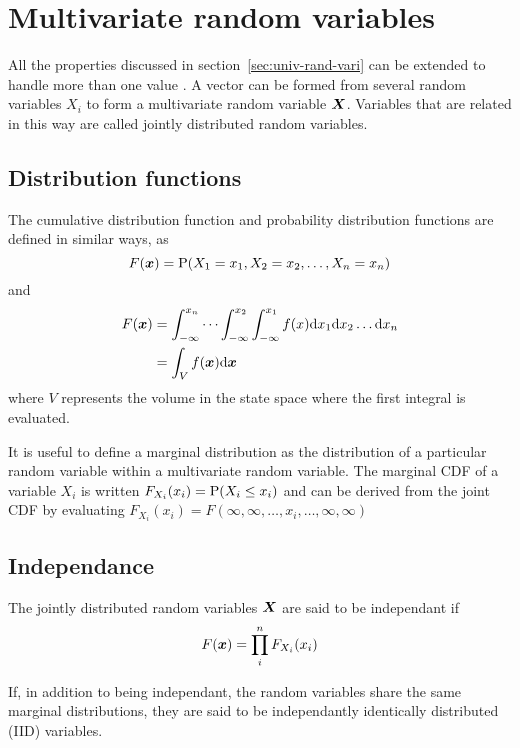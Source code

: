 \section{Multivariate random variables}
All the properties discussed in section~\ref{sec:univ-rand-vari} can be extended to handle more than one value \cite[65]{kulkarni1999modeling}.
A vector can be formed from several random variables $X_i$ to form a multivariate random variable $\boldsymbol{X}$.
Variables that are related in this way are called jointly distributed random variables.

\subsection{Distribution functions}
The cumulative distribution function and probability distribution functions are defined in similar ways, as 
\begin{equation}
  \label{eq:mvcdf}
  F(\boldsymbol{x}) = \mathrm{P}(X_1=x_1, X_2=x_2,\dots, X_n = x_n)
\end{equation}
and
\begin{align}
  \label{eq:mvpdf}
  F(\boldsymbol{x}) &= \int_{-\infty}^{x_n}\cdots\int_{-\infty}^{x_2}\int_{-\infty}^{x_1} f(x) \mathrm{d} x_1 \mathrm{d} x_2 \dots \mathrm{d} x_n \\
              &= \int_V f(\boldsymbol{x}) \mathrm{d} \boldsymbol{x}
\end{align}
where $V$ represents the volume in the state space where the first integral is evaluated.

It is useful to define a marginal distribution as the distribution of a particular random variable within a multivariate random variable.  
The marginal CDF of a variable $X_i$ is written $F_{X_i}(x_i) = \mathrm{P}(X_i \leq x_i)$ and can be derived from the joint CDF by evaluating $F_{X_i}(x_i) = F(\infty,\infty,\dots,x_i,\dots,\infty,\infty)$

\subsection{Independance}
The jointly distributed random variables $\boldsymbol{X}$ are said to be independant if 
\begin{equation}
  \label{eq:independance}
  F(\boldsymbol{x}) = \prod_i^n F_{X_i}(x_i)
\end{equation}

If, in addition to being independant, the random variables share the same marginal distributions, they are said to be independantly identically distributed (IID) variables.

